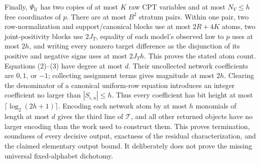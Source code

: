 Finally, \(\Psi_{\mathcal U}\) has two copies of at most \(K\) raw CPT variables and at most \(N_V\le h\) free coordinates of \(p\). There are at most \(B^2\) stratum pairs. Within one pair, two row-normalization and support/canonical blocks use at most \(2R+4K\) atoms, two joint-positivity blocks use \(2J_T\), equality of each model's observed law to \(p\) uses at most \(2h\), and writing every nonzero target difference as the disjunction of its positive and negative signs uses at most \(2J_Th\). This proves the stated atom count. Equations (2)--(3) have degree at most \(d\). Their uncollected network coefficients are \(0,1\), or \(-1\); collecting assignment terms gives magnitude at most \(2h\). Clearing the denominator of a canonical uniform-row equation introduces an integer coefficient no larger than \(|S_{i,u}|\le h\). Thus every coefficient has bit height at most \(\lceil\log_2(2h+1)\rceil\). Encoding each network atom by at most \(h\) monomials of length at most \(d\) gives the third line of \(\mathcal T\), and all other returned objects have no larger encoding than the work used to construct them. This proves termination, soundness of every decisive output, exactness of the residual characterization, and the claimed elementary output bound. It deliberately does not prove the missing universal fixed-alphabet dichotomy.